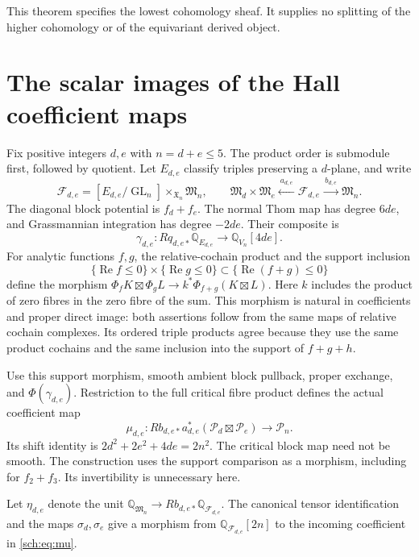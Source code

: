 This theorem specifies the lowest cohomology sheaf. It supplies no
splitting of the higher cohomology or of the equivariant derived object.

\section{The scalar images of the Hall coefficient maps}
\label{sch:sec:images}

Fix positive integers $d,e$ with $n=d+e\leq5$. The product order is
submodule first, followed by quotient. Let $E_{d,e}$ classify triples
preserving a $d$-plane, and write
\[
 \mathcal F_{d,e}=[E_{d,e}/\operatorname{GL}_n]
                         \mathbin{\times}_{\mathfrak X_n}\mathfrak M_n,
 \qquad
 \mathfrak M_d\times\mathfrak M_e
 \xleftarrow{\ a_{d,e}\ }\mathcal F_{d,e}
 \xrightarrow{\ b_{d,e}\ }\mathfrak M_n.
\]
The diagonal block potential is $f_d+f_e$.
The normal Thom map has degree $6de$, and Grassmannian integration
has degree $-2de$. Their composite is
\[
 \gamma_{d,e}:Rq_{d,e*}\mathbb Q_{E_{d,e}}
                      \longrightarrow\mathbb Q_{V_n}[4de].
\]
For analytic functions $f,g$, the relative-cochain product and the
support inclusion
\[
 \{\operatorname{Re}f\leq0\}\times\{\operatorname{Re}g\leq0\}
       \subset\{\operatorname{Re}(f+g)\leq0\}
\]
define the morphism
$\Phi_fK\boxtimes\Phi_gL\to k^*\Phi_{f+g}(K\boxtimes L)$.
Here $k$ includes the product of zero fibres in the zero fibre of the sum.
This morphism is natural in coefficients and proper direct image:
both assertions follow from the same maps of relative cochain complexes.
Its ordered triple products agree because they use the same product
cochains and the same inclusion into the support of $f+g+h$.

Use this support morphism, smooth ambient block pullback, proper
exchange, and $\Phi(\gamma_{d,e})$. Restriction to the full critical
fibre product defines the actual coefficient map
\begin{equation}
 \mu_{d,e}:Rb_{d,e*}a_{d,e}^*
       (\mathcal P_d\boxtimes\mathcal P_e)\longrightarrow\mathcal P_n.
 \label{sch:eq:mu}
\end{equation}
Its shift identity is $2d^2+2e^2+4de=2n^2$.
The critical block map need not be smooth.
The construction uses the support comparison as a morphism, including
for $f_2+f_3$. Its invertibility is unnecessary here.

Let $\eta_{d,e}$ denote the unit
$\mathbb Q_{\mathfrak M_n}\to Rb_{d,e*}\mathbb Q_{\mathcal F_{d,e}}$.
The canonical tensor identification and the maps $\sigma_d,\sigma_e$
give a morphism from $\mathbb Q_{\mathcal F_{d,e}}[2n]$ to the
incoming coefficient in \eqref{sch:eq:mu}.

